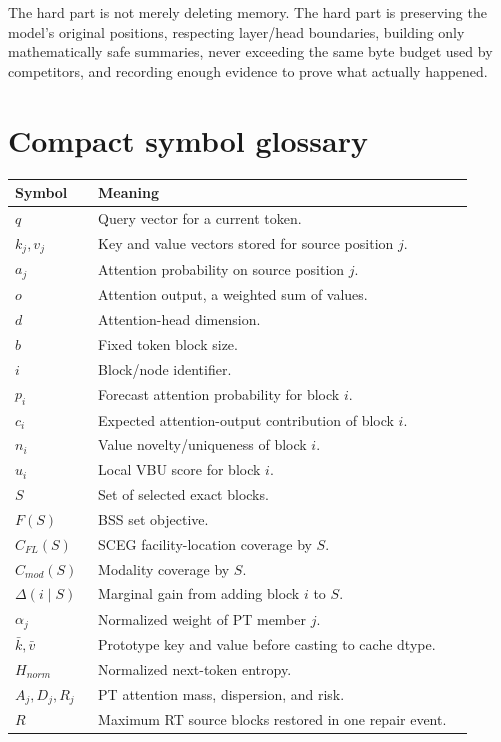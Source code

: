 \documentclass[11pt]{article}
\begin{document}
The hard part is not merely deleting memory. The hard part is preserving the model's original
positions, respecting layer/head boundaries, building only mathematically safe summaries, never
exceeding the same byte budget used by competitors, and recording enough evidence to prove what
actually happened.

\appendix

\section{Compact symbol glossary}

\begin{longtable}{>{\bfseries}p{0.16\linewidth}p{0.75\linewidth}}
\toprule
Symbol & Meaning \\
\midrule
\endhead
$q$ & Query vector for a current token. \\
$k_j,v_j$ & Key and value vectors stored for source position $j$. \\
$a_j$ & Attention probability on source position $j$. \\
$o$ & Attention output, a weighted sum of values. \\
$d$ & Attention-head dimension. \\
$b$ & Fixed token block size. \\
$i$ & Block/node identifier. \\
$p_i$ & Forecast attention probability for block $i$. \\
$c_i$ & Expected attention-output contribution of block $i$. \\
$n_i$ & Value novelty/uniqueness of block $i$. \\
$u_i$ & Local VBU score for block $i$. \\
$S$ & Set of selected exact blocks. \\
$F(S)$ & BSS set objective. \\
$C_{FL}(S)$ & SCEG facility-location coverage by $S$. \\
$C_{mod}(S)$ & Modality coverage by $S$. \\
$\Delta(i\mid S)$ & Marginal gain from adding block $i$ to $S$. \\
$\alpha_j$ & Normalized weight of PT member $j$. \\
$\bar{k},\bar{v}$ & Prototype key and value before casting to cache dtype. \\
$H_{norm}$ & Normalized next-token entropy. \\
$A_j,D_j,R_j$ & PT attention mass, dispersion, and risk. \\
$R$ & Maximum RT source blocks restored in one repair event. \\
\bottomrule
\end{longtable}
\end{document}
